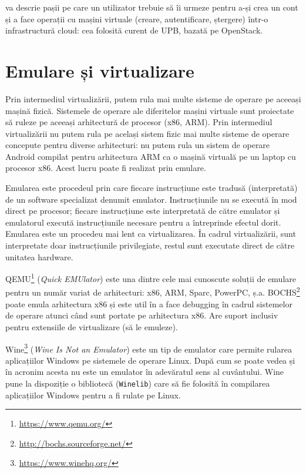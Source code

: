  va descrie pașii pe care un utilizator trebuie să îi urmeze pentru a-și crea un cont și a face operații cu mașini virtuale (creare, autentificare, ștergere) într-o infrastructură cloud: cea folosită curent de UPB, bazată pe OpenStack.

\section{Emulare și virtualizare}
\label{sec:vm:emulation}

Prin intermediul virtualizării, putem rula mai multe sisteme de operare pe aceeași mașină fizică.
Sistemele de operare ale diferitelor mașini virtuale sunt proiectate să ruleze pe aceeași arhitectură de procesor (x86, ARM).
Prin intermediul virtualizării nu putem rula pe același sistem fizic mai multe sisteme de operare concepute pentru diverse arhitecturi: nu putem rula un sistem de operare Android compilat pentru arhitectura ARM ca o mașină virtuală pe un laptop cu procesor x86.
Acest lucru poate fi realizat prin emulare.

Emularea este procedeul prin care fiecare instrucțiune este tradusă (interpretată) de un software specializat denumit emulator.
Instrucțiunile nu se execută în mod direct pe procesor;
fiecare instrucțiune este interpretată de către emulator și emulatorul execută instrucțiunile necesare pentru a întreprinde efectul dorit.
Emularea este un procedeu mai lent ca virtualizarea.
În cadrul virtualizării, sunt interpretate doar instrucțiunile privilegiate, restul sunt executate direct de către unitatea hardware.

QEMU\footnote{\url{https://www.qemu.org/}}  (\textit{Quick EMUlator}) este una dintre cele mai cunoscute soluții de emulare pentru un număr variat de arhitecturi: x86, ARM, Sparc, PowerPC, ș.a.
 BOCHS\footnote{\url{http://bochs.sourceforge.net/}} poate emula arhitectura x86 și este util în a face debugging în cadrul sistemelor de operare atunci când sunt portate pe arhitectura x86.
 Are suport inclusiv pentru extensiile de virtualizare (să le emuleze).

Wine\footnote{\url{https://www.winehq.org/}} (\textit{Wine Is Not an Emulator}) este un tip de emulator care permite rularea aplicațiilor Windows pe sistemele de operare Linux.
După cum se poate vedea și în acronim acesta nu este un emulator în adevăratul sens al cuvântului.
Wine pune la dispoziție o bibliotecă (\texttt{Winelib}) care să fie folosită în compilarea aplicațiilor Windows pentru a fi rulate pe Linux.

